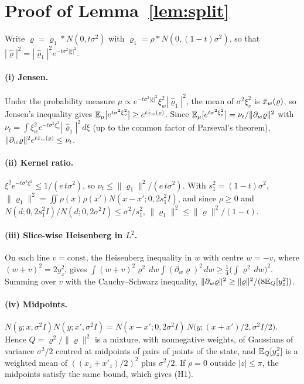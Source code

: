 \section{Proof of Lemma~\ref{lem:split}}
\label{app:split}

Write $\varrho = \varrho_1 * N(0, t\sigma^2)$ with $\varrho_1 = \rho * N(0, (1-t)\sigma^2)$, so that $|\hat\varrho|^2 = |\hat\varrho_1|^2 e^{-t\sigma^2|\xi|^2}$.

\paragraph*{(i) Jensen.} Under the probability measure $\mu \propto e^{-t\sigma^2|\xi|^2}\xi_w^2|\hat\varrho_1|^2$, the mean of $\sigma^2\xi_v^2$ is $\bar{x}_w(\varrho)$, so Jensen's inequality gives $\mathbb{E}_\mu[e^{t\sigma^2\xi_v^2}] \geq e^{t\bar{x}_w(\varrho)}$. Since $\mathbb{E}_\mu[e^{t\sigma^2\xi_v^2}] = \nu_t/\|\partial_w\varrho\|^2$ with $\nu_t = \int \xi_w^2 e^{-t\sigma^2\xi_w^2}|\hat\varrho_1|^2\,d\xi$ (up to the common factor of Parseval's theorem), $\|\partial_w\varrho\|^2 e^{t\bar{x}_w(\varrho)} \leq \nu_t$.

\paragraph*{(ii) Kernel ratio.} $\xi^2 e^{-t\sigma^2\xi^2} \leq 1/(e\,t\sigma^2)$, so $\nu_t \leq \|\varrho_1\|^2/(e\,t\sigma^2)$. With $s_1^2 = (1-t)\sigma^2$, $\|\varrho_1\|^2 = \iint\rho(x)\rho(x')N(x - x'; 0, 2s_1^2 I)$, and since $\rho \geq 0$ and $N(d; 0, 2s_1^2I)/N(d; 0, 2\sigma^2 I) \leq \sigma^2/s_1^2$, $\|\varrho_1\|^2 \leq \|\varrho\|^2/(1-t)$.

\paragraph*{(iii) Slice-wise Heisenberg in $L^2$.} On each line $v = \text{const}$, the Heisenberg inequality in $w$ with centre $w = -v$, where $(w+v)^2 = 2y_z^2$, gives $\int (w+v)^2\varrho^2\,dw\int(\partial_w\varrho)^2\,dw \geq \frac14\big(\int\varrho^2\,dw\big)^2$. Summing over $v$ with the Cauchy--Schwarz inequality, $\|\partial_w\varrho\|^2 \geq \|\varrho\|^2/(8\mathbb{E}_Q[y_z^2])$.

\paragraph*{(iv) Midpoints.} $N(y; x, \sigma^2 I)N(y; x', \sigma^2 I) = N(x - x'; 0, 2\sigma^2 I)\,N\big(y; (x+x')/2, \sigma^2 I/2\big)$. Hence $Q = \varrho^2/\|\varrho\|^2$ is a mixture, with nonnegative weights, of Gaussians of variance $\sigma^2/2$ centred at midpoints of pairs of points of the state, and $\mathbb{E}_Q[y_z^2]$ is a weighted mean of $((x_z + x'_z)/2)^2$ plus $\sigma^2/2$. If $\rho = 0$ outside $|z| \leq \pi$, the midpoints satisfy the same bound, which gives (H1).

